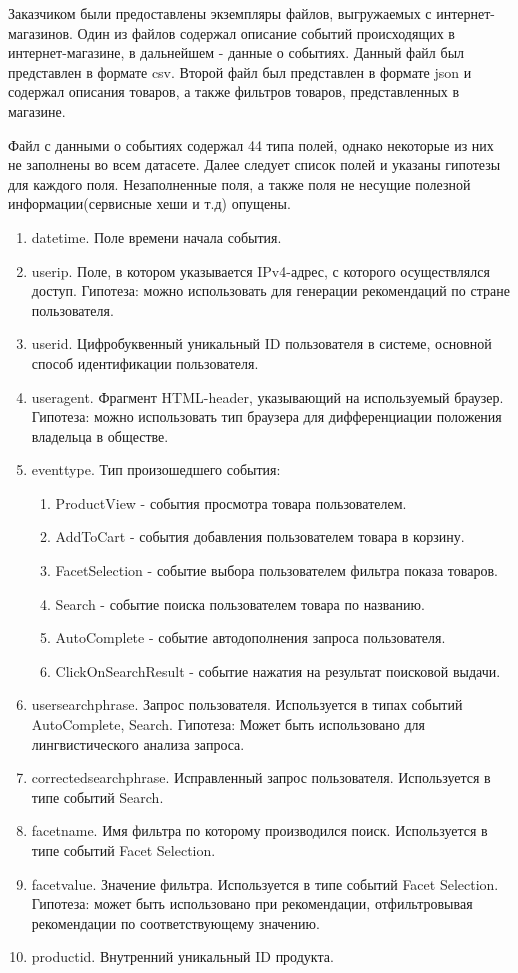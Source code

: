 \documentclass[14pt]{mmcs_article}
\newenvironment{myenumerate}
{ \begin{enumerate}
		\setlength{\itemsep}{0pt}
		\setlength{\parskip}{0pt}
		\setlength{\parsep}{0pt}     }
	{ \end{enumerate}                  }
\begin{document}
Заказчиком были предоставлены экземпляры файлов, выгружаемых с интернет-магазинов.  
Один из файлов содержал описание событий происходящих в интернет-магазине, в дальнейшем - данные о событиях. Данный файл был представлен в формате csv. Второй файл был представлен в формате json и содержал описания товаров, а также фильтров товаров, представленных в магазине. 

Файл с данными о событиях содержал 44 типа полей, однако некоторые из них не заполнены во всем датасете. Далее следует список полей и указаны гипотезы для каждого поля. Незаполненные поля, а также поля не несущие полезной информации(сервисные хеши и т.д) опущены.
\begin{myenumerate}
	\item datetime. Поле времени начала события. 
	\item userip. Поле, в котором указывается IPv4-адрес, с которого осуществлялся доступ. Гипотеза: можно использовать для генерации рекомендаций по стране пользователя.
	\item userid. Цифробуквенный уникальный ID пользователя в системе, основной способ идентификации пользователя.
	\item useragent. Фрагмент HTML-header, указывающий на используемый браузер. Гипотеза: можно использовать тип браузера для дифференциации положения владельца в обществе. 
	\item eventtype. Тип произошедшего события: 
	\begin{myenumerate}
		\item ProductView - события просмотра товара пользователем. 
		\item AddToCart - события добавления пользователем товара в корзину. 
		\item FacetSelection - событие выбора пользователем фильтра показа товаров.  
		\item Search - событие поиска пользователем товара по названию.
		\item AutoComplete - событие автодополнения запроса пользователя. 
		\item ClickOnSearchResult - событие нажатия на результат поисковой выдачи. 
	\end{myenumerate}
	\item usersearchphrase. Запрос пользователя. Используется в типах событий AutoComplete, Search. Гипотеза: Может быть использовано для лингвистического анализа запроса.
	\item correctedsearchphrase. Исправленный запрос пользователя. Используется в типе событий Search. 
	\item facetname. Имя фильтра по которому производился поиск. Используется в типе событий Facet Selection. 
	\item facetvalue. Значение фильтра. Используется в типе событий Facet Selection. Гипотеза: может быть использовано при рекомендации, отфильтровывая рекомендации по соответствующему значению. 
	\item productid. Внутренний уникальный ID продукта. 
\end{myenumerate}
\end{document}
